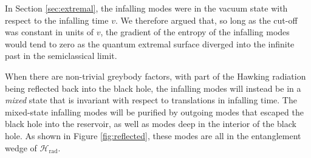 \documentclass[12pt]{article}
\begin{document}
In Section \ref{sec:extremal}, the infalling modes were in the vacuum state with respect to the infalling time $v$. We therefore argued that, so long as the cut-off was constant in units of $v$, the gradient of the entropy of the infalling modes would tend to zero as the quantum extremal surface diverged into the infinite past in the semiclassical limit.

When there are non-trivial greybody factors, with part of the Hawking radiation being reflected back into the black hole, the infalling modes will instead be in a \emph{mixed} state that is invariant with respect to translations in infalling time. The mixed-state infalling modes will be purified by outgoing modes that escaped the black hole into the reservoir, as well as modes deep in the interior of the black hole. As shown in Figure \ref{fig:reflected}, these modes are all in the entanglement wedge of $\mathcal{H}_\text{rad}$. 
\end{document}
